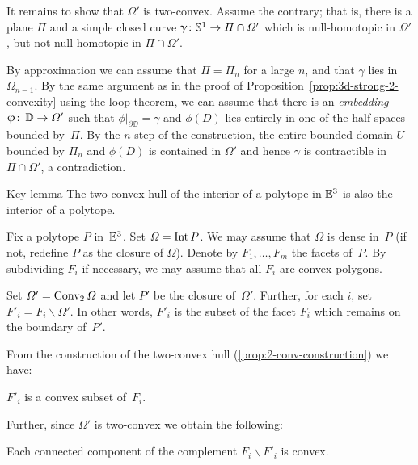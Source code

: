 It remains to show that $\Omega'$ is two-convex.
Assume the contrary; 
that is, there is a plane $\Pi$ 
and a simple closed curve $\gamma\:\SS^1\to \Pi\cap \Omega'$ 
which is null-homotopic in $\Omega'$,
but not null-homotopic in $\Pi\cap\Omega'$.

By approximation we can assume that $\Pi=\Pi_n$ for a large $n$, and that $\gamma$ lies in $\Omega_{n-1}$.
By the same argument as in the proof of Proposition~\ref{prop:3d-strong-2-convexity} using the loop theorem, we can assume that there is an \emph{embedding} $\phi\co \DD\to \Omega'$ such that $\phi|_{\partial\DD}=\gamma$ and $\phi(D)$ lies entirely in one of the half-spaces bounded by~$\Pi$.
By the $n$-step of the construction, the entire bounded domain $U$ bounded by $ \Pi_n$ and $\phi(D)$ is contained in $\Omega'$ and hence $\gamma$ is contractible in $\Pi\cap\Omega'$, a contradiction. \qeds

\begin{thm}{Key lemma}\label{lem:key-shefel}
The two-convex hull of the interior of a polytope in $\mathbb{E}^3$
is also the interior of a polytope.
\end{thm}

Fix a polytope $P$ in~$\mathbb{E}^3$.
Set $\varOmega=\mathop{\rm Int}\nolimits P$.
We may assume that  $\Omega$ is dense in~$P$
(if not, redefine $P$ as the closure of $\Omega$).
Denote by $F_1,\dots,F_m$ the facets of~$P$. 
By subdividing $F_i$ if necessary, we may assume that all $F_i$ are convex polygons.

Set $\varOmega'=\mathop{\rm Conv}\nolimits_2\varOmega$ and let $P'$ be the closure of~$\Omega'$.
Further, 
for each $i$, 
set $F'_i=F_i\backslash \Omega'$.
In other words, 
$F'_i$ is the subset of the facet $F_i$ 
which remains on the boundary of~$P'$.

From the construction of the two-convex hull (\ref{prop:2-conv-construction}) we have:

\begin{clm}{}\label{clm:F'-convex}
$F'_i$ is  a convex subset of~$F_i$.
\end{clm}

Further, since $\Omega'$ is two-convex we obtain the following:

\begin{clm}{}\label{clm:complement-of-F'-convex}
Each connected component of the complement $F_i\backslash F'_i$ is convex.
\end{clm}

